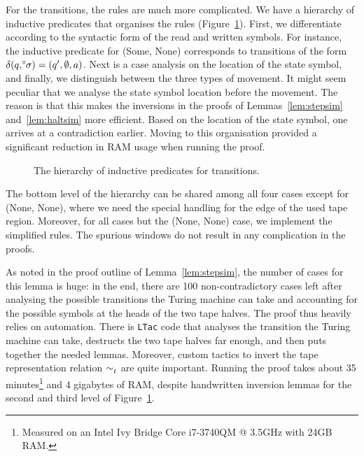 For the transitions, the rules are much more complicated. We have a hierarchy of inductive predicates that organises the rules (Figure~\ref{fig:orga_rules}). First, we differentiate according to the syntactic form of the read and written symbols. For instance, the inductive predicate for (Some, None) corresponds to transitions of the form $\delta (q, \degree\kern-0.5ex\sigma) = (q', \emptyset, a)$. 
Next is a case analysis on the location of the state symbol, and finally, we distinguish between the three types of movement.
It might seem peculiar that we analyse the state symbol location before the movement. The reason is that this makes the inversions in the proofs of Lemmas~\ref{lem:stepsim} and~\ref{lem:haltsim} more efficient. Based on the location of the state symbol, one arrives at a contradiction earlier. Moving to this organisation provided a significant reduction in RAM usage when running the proof. 
\begin{figure}
  \begin{center}
  \end{center}
  \caption{The hierarchy of inductive predicates for transitions.}\label{fig:orga_rules}
\end{figure}

The bottom level of the hierarchy can be shared among all four cases except for (None, None), where we need the special handling for the edge of the used tape region. Moreover, for all cases but the (None, None) case, we implement the simplified rules. The spurious windows do not result in any complication in the proofs.

As noted in the proof outline of Lemma~\ref{lem:stepsim}, the number of cases for this lemma is huge: in the end, there are 100 non-contradictory cases left after analysing the possible transitions the Turing machine can take and accounting for the possible symbols at the heads of the two tape halves. The proof thus heavily relies on automation. There is \texttt{LTac} code that analyses the transition the Turing machine can take, destructs the two tape halves far enough, and then puts together the needed lemmas. Moreover, custom tactics to invert the tape representation relation $\sim_t^{}$ are quite important.
Running the proof takes about 35 minutes\footnote{Measured on an Intel Ivy Bridge Core i7-3740QM @ 3.5GHz with 24GB RAM.} and 4 gigabytes of RAM, despite handwritten inversion lemmas for the second and third level of Figure~\ref{fig:orga_rules}. 

